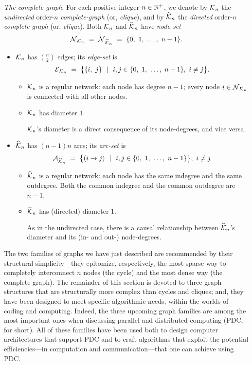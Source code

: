 \bigskip

{\it The {\em complete} graph}.
%
For each positive integer $n \in \mathbb{N}^+$, we denote by $\mbox{$\cal K$}_n$ the {\em
  undirected} order-$n$ {\it complete-graph} (or, {\it clique}),
  and by $\widehat{\mbox{$\cal K$}}_n$ the {\em
  directed} order-$n$ {\it complete-graph} (or, {\it clique}).  Both
$\mbox{$\cal K$}_n$ and $\widehat{\mbox{$\cal K$}}_n$ have {\it node-set}
\[ \mbox{$\cal N$}_{{\cal K}_n} \ = \ \mbox{$\cal N$}_{\widehat{{\cal K}}_n}
\ = \ \{ 0, \ 1, \ \ldots, \ n-1\}. \]
\begin{itemize}
\item
$\mbox{$\cal K$}_n$ has $\displaystyle {n \choose 2}$ edges; its {\it edge-set} is
\[ \mbox{$\cal E$}_{{\cal K}_n} \ = \
\big\{ \{i, \ j\} \ \ | \ \ i,j \in \{0, \ 1, \ \ldots, \ n-1\}, \ i
\neq j \big\}.
\]
  \begin{itemize}
  \item {} 
$\mbox{$\cal K$}_n$ is a regular network: each node has degree $n-1$; every node $i
\in \mbox{$\cal N$}_{\mbox{{\scriptsize $\cal K$}}_n}$ is connected with all other nodes.

   \item {}
$\mbox{$\cal K$}_n$ has diameter $1$.

$\mbox{$\cal K$}_n$'s diameter is a direct consequence of its node-degrees, and vice versa.
  \end{itemize}

\item
$\widehat{\mbox{$\cal K$}}_n$ has $(n-1)n$ arcs; its {\it arc-set} is
\[ \a_{\widehat{{\cal K}}_n} \ = \ 
\big\{ (i \rightarrow j) \ \ | \ \ i,j \in \{0, \ 1, \ \ldots, \ n-1\}
\big\}, \ i \neq j
\]
  \begin{itemize}
  \item
$\widehat{\mbox{$\cal K$}}_n$ is a regular network: each node has the same indegree
    and the same outdegree.  Both the common indegree and the common
    outdegree are $n-1$.
  \item
$\widehat{\mbox{$\cal K$}}_n$ has (directed) diameter $1$.

As in the undirected case, there is a causal relationship between
$\widehat{\mbox{$\cal K$}}_n$'s diameter and its (in- and out-) node-degrees.
  \end{itemize}
\end{itemize}

\bigskip

The two families of graphs we have just described are recommended by
their structural simplicity---they epitomize, respectively, the most
sparse way to completely interconnect $n$ nodes (the cycle) and the
most dense way (the complete graph).  The remainder of this section is
devoted to three graph-structures that are structurally more complex
than cycles and cliques; and, they have been designed to meet specific
algorithmic needs, within the worlds of coding and computing.  Indeed,
the three upcoming graph families are among the most important ones
when discussing parallel and distributed computing (PDC, for short).
All of these families have been used both to design computer
architectures that support PDC and to craft algorithms that exploit
the potential efficiencies---in computation and communication---that
one can achieve using PDC.


